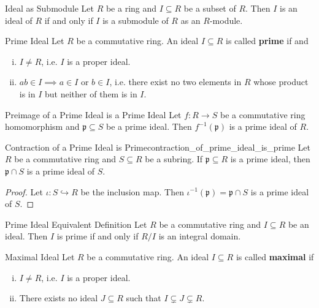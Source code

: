 \begin{proposition}{Ideal as Submodule}{}
    Let $R$ be a ring and $I\subseteq R$ be a subset of $R$. Then $I$ is an ideal of $R$ if and only if $I$ is a submodule of $R$ as an $R$-module.
\end{proposition}


\begin{definition}{Prime Ideal}{}
    Let $R$ be a commutative ring. An ideal $I\subseteq R$ is called \textbf{prime} if  and 
    \begin{enumerate}[(i)]
        \item $I\neq R$, i.e. $I$ is a proper ideal.
        \item $ab\in I\implies a\in I\text{ or }b\in I$, i.e. there exist no two elements in $R$ whose product is in $I$ but neither of them is in $I$.
    \end{enumerate}    
\end{definition}

\begin{proposition}{Preimage of a Prime Ideal is a Prime Ideal}{}
    Let $f:R\to S$ be a commutative ring homomorphism and $\mathfrak{p}\subseteq S$ be a prime ideal. Then $f^{-1}(\mathfrak{p})$ is a prime ideal of $R$.
\end{proposition}
\begin{corollary}{Contraction of a Prime Ideal is Prime}{contraction_of_prime_ideal_is_prime}
    Let $R$ be a commutative ring and $S\subseteq R$ be a subring. If $\mathfrak{p}\subseteq R$ is a prime ideal, then $\mathfrak{p}\cap S$ is a prime ideal of $S$.
\end{corollary}
\begin{proof}
    Let $\iota:S\hookrightarrow R$ be the inclusion map. Then $\iota^{-1}(\mathfrak{p})=\mathfrak{p}\cap S$ is a prime ideal of $S$.
\end{proof}

\begin{proposition}{Prime Ideal Equivalent Definition}{}
    Let $R$ be a commutative ring and $I\subseteq R$ be an ideal. Then $I$ is prime if and only if $R/I$ is an integral domain.
\end{proposition}

\begin{definition}{Maximal Ideal}{}
    Let $R$ be a commutative ring. An ideal $I\subseteq R$ is called \textbf{maximal} if
    \begin{enumerate}[(i)]
        \item $I\ne R$, i.e. $I$ is a proper ideal.
        \item There exists no ideal $J\subseteq R$ such that $I\subsetneq J\subsetneq R$.
    \end{enumerate}
\end{definition}

